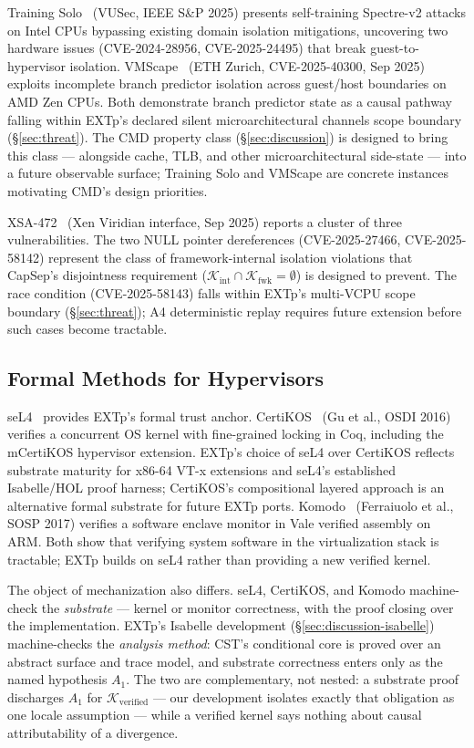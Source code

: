 \documentclass[conference]{IEEEtran}
\newcommand{\Kverified}{\mathcal{K}_\text{verified}}
\newcommand{\Kint}{\mathcal{K}_\text{int}}
\newcommand{\Kfwk}{\mathcal{K}_\text{fwk}}
\begin{document}
Training Solo~\cite{barberis2025trainingsolo} (VUSec, IEEE S\&P
2025) presents self-training Spectre-v2 attacks on Intel CPUs
bypassing existing domain isolation mitigations, uncovering two
hardware issues (CVE-2024-28956, CVE-2025-24495) that break
guest-to-hypervisor isolation. VMScape~\cite{vmscape2025} (ETH
Zurich, CVE-2025-40300, Sep 2025) exploits incomplete branch
predictor isolation across guest/host boundaries on AMD Zen CPUs.
Both demonstrate branch predictor state as a causal pathway falling
within EXTp's declared silent microarchitectural channels scope
boundary (\S\ref{sec:threat}). The CMD property class
(\S\ref{sec:discussion}) is designed to bring this class ---
alongside cache, TLB, and other microarchitectural side-state ---
into a future observable surface; Training Solo and VMScape are
concrete instances motivating CMD's design priorities.

XSA-472~\cite{xsa472} (Xen Viridian interface, Sep 2025) reports a
cluster of three vulnerabilities. The two NULL pointer dereferences
(CVE-2025-27466, CVE-2025-58142) represent the class of
framework-internal isolation violations that CapSep's disjointness
requirement ($\Kint \cap \Kfwk = \emptyset$) is designed to prevent.
The race condition (CVE-2025-58143) falls within EXTp's multi-VCPU
scope boundary (\S\ref{sec:threat}); A4 deterministic replay
requires future extension before such cases become tractable.

\subsection{Formal Methods for Hypervisors}

seL4~\cite{klein2009sel4,klein2014sel4} provides EXTp's formal trust
anchor. CertiKOS~\cite{gu2016certikos} (Gu et al., OSDI 2016)
verifies a concurrent OS kernel with fine-grained locking in Coq,
including the mCertiKOS hypervisor extension. EXTp's choice of seL4
over CertiKOS reflects substrate maturity for x86-64 VT-x extensions
and seL4's established Isabelle/HOL proof harness; CertiKOS's
compositional layered approach is an alternative formal substrate
for future EXTp ports. Komodo~\cite{ferraiuolo2017komodo}
(Ferraiuolo et al., SOSP 2017) verifies a software enclave monitor
in Vale verified assembly on ARM. Both show that verifying system
software in the virtualization stack is tractable; EXTp builds on
seL4 rather than providing a new verified kernel.

The object of mechanization also differs. seL4, CertiKOS, and Komodo
machine-check the \emph{substrate} --- kernel or monitor correctness,
with the proof closing over the implementation. EXTp's Isabelle
development (\S\ref{sec:discussion-isabelle}) machine-checks the
\emph{analysis method}: CST's conditional core is proved over an
abstract surface and trace model, and substrate correctness enters
only as the named hypothesis $A_1$. The two are complementary, not
nested: a substrate proof discharges $A_1$ for $\Kverified$ ---
our development isolates exactly that obligation as one locale
assumption --- while a verified kernel says nothing about causal
attributability of a divergence.
\end{document}
